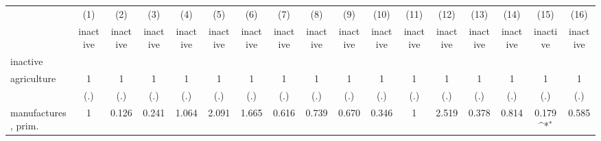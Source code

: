 {
\def\sym#1{\ifmmode^{#1}\else\(^{#1}\)\fi}
\begin{tabular}{l*{16}{c}}
\hline\hline
                    &\multicolumn{1}{c}{(1)}&\multicolumn{1}{c}{(2)}&\multicolumn{1}{c}{(3)}&\multicolumn{1}{c}{(4)}&\multicolumn{1}{c}{(5)}&\multicolumn{1}{c}{(6)}&\multicolumn{1}{c}{(7)}&\multicolumn{1}{c}{(8)}&\multicolumn{1}{c}{(9)}&\multicolumn{1}{c}{(10)}&\multicolumn{1}{c}{(11)}&\multicolumn{1}{c}{(12)}&\multicolumn{1}{c}{(13)}&\multicolumn{1}{c}{(14)}&\multicolumn{1}{c}{(15)}&\multicolumn{1}{c}{(16)}\\
                    &\multicolumn{1}{c}{inactive}&\multicolumn{1}{c}{inactive}&\multicolumn{1}{c}{inactive}&\multicolumn{1}{c}{inactive}&\multicolumn{1}{c}{inactive}&\multicolumn{1}{c}{inactive}&\multicolumn{1}{c}{inactive}&\multicolumn{1}{c}{inactive}&\multicolumn{1}{c}{inactive}&\multicolumn{1}{c}{inactive}&\multicolumn{1}{c}{inactive}&\multicolumn{1}{c}{inactive}&\multicolumn{1}{c}{inactive}&\multicolumn{1}{c}{inactive}&\multicolumn{1}{c}{inactive}&\multicolumn{1}{c}{inactive}\\
\hline
inactive            &                     &                     &                     &                     &                     &                     &                     &                     &                     &                     &                     &                     &                     &                     &                     &                     \\
agriculture         &           1         &           1         &           1         &           1         &           1         &           1         &           1         &           1         &           1         &           1         &           1         &           1         &           1         &           1         &           1         &           1         \\
                    &         (.)         &         (.)         &         (.)         &         (.)         &         (.)         &         (.)         &         (.)         &         (.)         &         (.)         &         (.)         &         (.)         &         (.)         &         (.)         &         (.)         &         (.)         &         (.)         \\
[1em]
manufactures, prim. &           1         &       0.126         &       0.241         &       1.064         &       2.091         &       1.665         &       0.616         &       0.739         &       0.670         &       0.346         &           1         &       2.519         &       0.378         &       0.814         &       0.179\sym{*}  &       0.585         \\

\end{tabular}}
